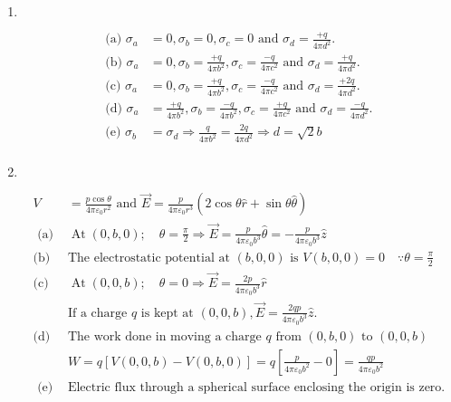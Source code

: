\begin{enumerate}
\item $\left. \right. $
\begin{answer}
	\begin{align*}
\text{(a) }\sigma_{a}&=0, \sigma_{b}=0, \sigma_{c}=0\text{ and }\sigma_{d}=\frac{+q}{4 \pi d^{2}}.\\
	\text{(b) }\sigma_{a}&=0, \sigma_{b}=\frac{+q}{4 \pi b^{2}}, \sigma_{c}=\frac{-q}{4 \pi c^{2}}\text{ and }\sigma_{d}=\frac{+q}{4 \pi d^{2}}.\\
	\text{(c) }\sigma_{a}&=0, \sigma_{b}=\frac{+q}{4 \pi b^{2}}, \sigma_{c}=\frac{-q}{4 \pi c^{2}}\text{ and }\sigma_{d}=\frac{+2 q}{4 \pi d^{2}}.\\
	\text{(d) }\sigma_{a}&=\frac{+q}{4 \pi b^{2}}, \sigma_{b}=\frac{-q}{4 \pi b^{2}}, \sigma_{c}=\frac{+q}{4 \pi c^{2}}\text{ and }\sigma_{d}=\frac{-q}{4 \pi d^{2}}.\\
	\text{(e) }\sigma_{b}&=\sigma_{d} \Rightarrow \frac{q}{4 \pi b^{2}}=\frac{2 q}{4 \pi d^{2}} \Rightarrow d=\sqrt{2} b\\
	\end{align*}
\end{answer}
\item $\left. \right. $
\begin{answer}
	\begin{align*}
 V&=\frac{p \cos \theta}{4 \pi \varepsilon_{0} r^{2}}\text{ and }\vec{E}=\frac{p}{4 \pi \varepsilon_{0} r^{3}}(2 \cos \theta \hat{r}+\sin \theta \hat{\theta})\\
\text{	(a) }&\operatorname{At}(0, b, 0) ; \quad \theta=\frac{\pi}{2} \Rightarrow \vec{E}=\frac{p}{4 \pi \varepsilon_{0} b^{3}} \hat{\theta}=-\frac{p}{4 \pi \varepsilon_{0} b^{3}} \hat{z}\\
	\text{(b) }&\text{The electrostatic potential at $(b, 0,0)$ is }V(b, 0,0)=0 \quad \because \theta=\frac{\pi}{2}\\
	\text{(c) }&\operatorname{At}(0,0, b) ; \quad \theta=0 \Rightarrow \vec{E}=\frac{2 p}{4 \pi \varepsilon_{0} b^{3}} \hat{r}\\
	&\text{If a charge $q$ is kept at }(0,0, b), \vec{E}=\frac{2 q p}{4 \pi \varepsilon_{0} b^{3}} \hat{z}.\\
	\text{(d) }&\text{The work done in moving a charge $q$ from }(0, b, 0)\text{ to }(0,0, b)\\&
	 W=q[V(0,0, b)-V(0, b, 0)]=q\left[\frac{p}{4 \pi \varepsilon_{0} b^{2}}-0\right]=\frac{q p}{4 \pi \varepsilon_{0} b^{2}}\\
\text{	(e) }&\text{Electric flux through a spherical surface enclosing the origin is zero.}

\end{align*}
\end{answer}
\end{enumerate}
